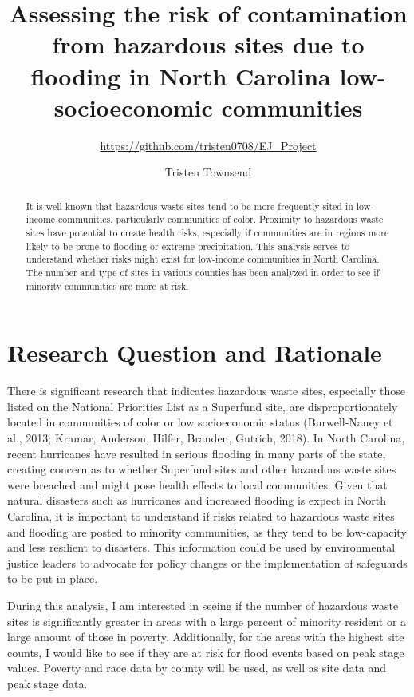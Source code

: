 \documentclass[12pt,]{article}
\title{Assessing the risk of contamination from hazardous sites due to flooding
in North Carolina low-socioeconomic communities}
\subtitle{\url{https://github.com/tristen0708/EJ_Project}}
\author{Tristen Townsend}
\date{}
\begin{document}
\maketitle
\begin{abstract}
It is well known that hazardous waste sites tend to be more frequently
sited in low-income communities, particularly communities of color.
Proximity to hazardous waste sites have potential to create health
risks, especially if communities are in regions more likely to be prone
to flooding or extreme precipitation. This analysis serves to understand
whether risks might exist for low-income communities in North Carolina.
The number and type of sites in various counties has been analyzed in
order to see if minority communities are more at risk.
\end{abstract}

\newpage

\tableofcontents  \newpage

\section{Research Question and
Rationale}\label{research-question-and-rationale}

There is significant research that indicates hazardous waste sites,
especially those listed on the National Priorities List as a Superfund
site, are disproportionately located in communities of color or low
socioeconomic status (Burwell-Naney et al., 2013; Kramar, Anderson,
Hilfer, Branden, Gutrich, 2018). In North Carolina, recent hurricanes
have resulted in serious flooding in many parts of the state, creating
concern as to whether Superfund sites and other hazardous waste sites
were breached and might pose health effects to local communities. Given
that natural disasters such as hurricanes and increased flooding is
expect in North Carolina, it is important to understand if risks related
to hazardous waste sites and flooding are posted to minority
communities, as they tend to be low-capacity and less resilient to
disasters. This information could be used by environmental justice
leaders to advocate for policy changes or the implementation of
safeguards to be put in place.

During this analysis, I am interested in seeing if the number of
hazardous waste sites is significantly greater in areas with a large
percent of minority resident or a large amount of those in poverty.
Additionally, for the areas with the highest site counts, I would like
to see if they are at risk for flood events based on peak stage values.
Poverty and race data by county will be used, as well as site data and
peak stage data.
\end{document}
